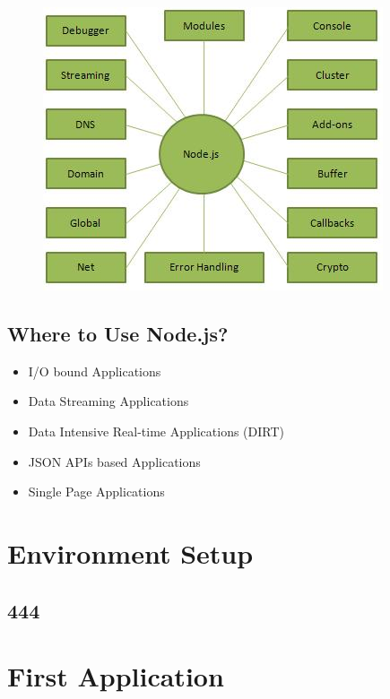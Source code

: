 \documentclass[a4paper,12pt]{book}
\begin{document}
\begin{figure}
	 \includegraphics[width=\linewidth]{nodejs_concepts.jpg}
	 \caption{}
	 \label{fig:fig}
	
\end{figure}


\section{Where to Use Node.js?}
\begin{itemize}
\item I/O bound Applications
	
\item	Data Streaming Applications
	
\item Data Intensive Real-time Applications (DIRT)
	
\item	JSON APIs based Applications
	
\item	Single Page Applications	
\end{itemize}
\chapter{Environment Setup}
\section{444}
\chapter{First Application}
\end{document}
